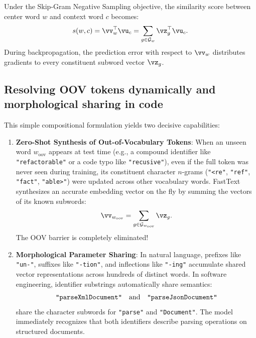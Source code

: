 \documentclass[../../main.tex]{subfiles}
\begin{document}
Under the Skip-Gram Negative Sampling objective, the similarity score between center word $w$ and context word $c$ becomes:
\begin{equation}
\label{eq:fasttext_scoring}
s(w, c) = \vv_w^\top \vu_c = \sum_{g \in \mathcal{G}_w} \vz_g^\top \vu_c.
\end{equation}
During backpropagation, the prediction error with respect to $\vv_w$ distributes gradients to every constituent subword vector $\vz_g$.

\subsection{Resolving OOV tokens dynamically and morphological sharing in code}
\label{subsec:fasttext_oov_resolution}

This simple compositional formulation yields two decisive capabilities:

\begin{enumerate}
    \item \textbf{Zero-Shot Synthesis of Out-of-Vocabulary Tokens}:
    When an unseen word $w_{\text{oov}}$ appears at test time (e.g., a compound identifier like \texttt{"refactorable"} or a code typo like \texttt{"recusive"}), even if the full token was never seen during training, its constituent character $n$-grams (\texttt{"<re"}, \texttt{"ref"}, \texttt{"fact"}, \texttt{"able>"}) were updated across other vocabulary words.
    FastText synthesizes an accurate embedding vector on the fly by summing the vectors of its known subwords:
    \begin{equation}
    \label{eq:fasttext_oov_synth}
    \vv_{w_{\text{oov}}} = \sum_{g \in \mathcal{G}_{w_{\text{oov}}}} \vz_g.
    \end{equation}
    The OOV barrier is completely eliminated!
    
    \item \textbf{Morphological Parameter Sharing}:
    In natural language, prefixes like \texttt{"un-"}, suffixes like \texttt{"-tion"}, and inflections like \texttt{"-ing"} accumulate shared vector representations across hundreds of distinct words.
    In software engineering, identifier substrings automatically share semantics:
    \begin{equation}
    \label{eq:code_subword_sharing}
    \text{\texttt{"parseXmlDocument"}} \quad \text{and} \quad \text{\texttt{"parseJsonDocument"}}
    \end{equation}
    share the character subwords for \texttt{"parse"} and \texttt{"Document"}. The model immediately recognizes that both identifiers describe parsing operations on structured documents.
\end{enumerate}
\end{document}

